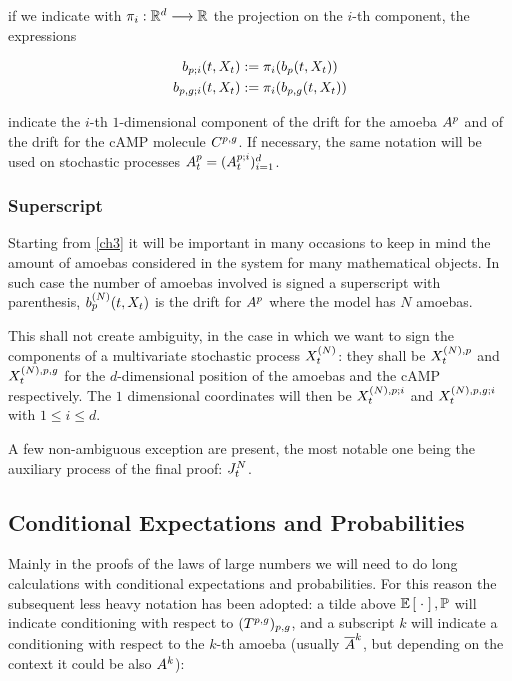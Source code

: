 \ie if we indicate with $\pi_i: \mathbb{R}^d \longrightarrow \mathbb{R}$ the projection on the $i$-th component, the expressions

\begin{gather*}
	b_{p; i}(t, X_t) : = \pi_i ( b_{p}(t, X_t) )
	\\
	b_{p,g; i}(t, X_t) := \pi_i ( b_{p,g}(t, X_t) )
\end{gather*}

indicate the $i$-th $1$-dimensional component of the drift for the amoeba $A^p$ and of the drift for the cAMP molecule $C^{p,g}$.
If necessary, the same notation will be used on stochastic processes $A_t^{p} = ( A_t^{p;i} )_{i =1}^d$. 

\subsubsection{Superscript}

Starting from \ref{ch3} it will be important in many occasions to keep in mind the amount of amoebas considered in the system for many mathematical objects.
In such case the number of amoebas involved is signed a superscript with parenthesis, \eg $b_{p}^{(N)}(t, X_t)$ is the drift for $A^p$ where the model has $N$ amoebas.

This shall not create ambiguity, in the case in which we want to sign the components of a multivariate stochastic process $X_t^{(N)}$: they shall be $X_t^{(N),p}$ and  $X_t^{(N),p,g}$ for the $d$-dimensional position of the amoebas and the cAMP respectively. The $1$ dimensional coordinates will then be $X_t^{(N),p;i}$ and  $X_t^{(N),p,g;i}$ with $1 \leq i \leq d$.

A few non-ambiguous exception are present, the most notable one being the auxiliary process of the final proof: $J_t^N$.

\subsection{Conditional Expectations and Probabilities}

Mainly in the proofs of the laws of large numbers we will need to do long calculations with conditional expectations and probabilities.
For this reason the subsequent less heavy notation has been adopted: a tilde above $\mathbb{E} \left[ \; \cdot \; \right], \mathbb{P}$ will indicate conditioning with respect to $ (T^{p,g})_{p,g}$, and a subscript $k$ will indicate a conditioning with respect to the $k$-th amoeba (usually $\overline{A}^k$, but depending on the context it could be also $A^k$):

